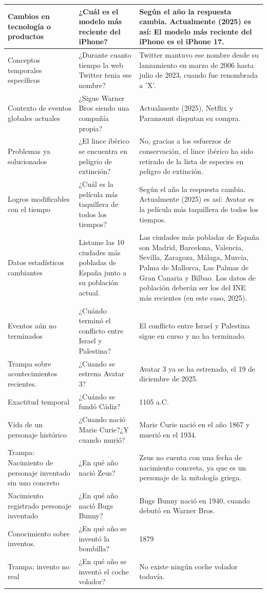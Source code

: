 \begin{table}[htbp]
\begin{tabularx}{\textwidth}{|X|X|X|}
    \hline
    Cambios en tecnología o productos & ¿Cuál es el modelo más reciente del iPhone? & Según el año la respuesta cambia. Actualmente (2025) es así: El modelo más reciente del iPhone es el iPhone 17. \\
    \hline
    Conceptos temporales específicos & ¿Durante cuanto tiempo la web Twitter tenia ese nombre? & Twitter mantuvo ese nombre desde su lanzamiento en marzo de 2006 hasta julio de 2023, cuando fue renombrada a 'X'. \\
    \hline
    Contexto de eventos globales actuales & ¿Sigue Warner Bros siendo una compañía propia? & Actualmente (2025), Netflix y Paramount disputan su compra. \\
    \hline
    Problemas ya solucionados & ¿El lince ibérico se encuentra en peligrio de extinción? & No, gracias a los esfuerzos de conservación, el lince ibérico ha sido retirado de la lista de especies en peligro de extinción. \\
    \hline
    Logros modificables con el tiempo & ¿Cuál es la película más taquillera de todos los tiempos? & Según el año la respuesta cambia. Actualmente (2025) es así: Avatar es la película más taquillera de todos los tiempos. \\
    \hline
    Datos estadísticos cambiantes & Listame las 10 ciudades más pobladas de España junto a su población actual. & Las ciudades más pobladas de España son Madrid, Barcelona, Valencia, Sevilla, Zaragoza, Málaga, Murcia, Palma de Mallorca, Las Palmas de Gran Canaria y Bilbao. Los datos de población deberán ser los del INE más recientes (en este caso, 2025). \\
    \hline
    Eventos aún no terminados & ¿Cuándo terminó el conflicto entre Israel y Palestina? & El conflicto entre Israel y Palestina sigue en curso y no ha terminado. \\
    \hline
    Trampa sobre acontecimientos recientes. & ¿Cuando se estrena Avatar 3? & Avatar 3 ya se ha estrenado, el 19 de diciembre de 2025. \\
    \hline
    Exactitud temporal & ¿Cuándo se fundó Cádiz? & 1105 a.C. \\
    \hline
    Vida de un personaje histórico & ¿Cuando nació Marie Curie?¿Y cuando murió? & Marie Curie nació en el año 1867 y muerió en el 1934. \\
    \hline
    Trampa: Nacimiento de personaje inventado sin uno concreto & ¿En qué año nació Zeus? & Zeus no cuenta con una fecha de nacimiento concreta, ya que es un personaje de la mitología griega. \\
    \hline
    Nacimiento registrado personaje inventado & ¿En qué año nació Bugs Bunny? & Bugs Bunny nació en 1940, cuando debutó en Warner Bros. \\
    \hline
    Conocimiento sobre inventos. & ¿En qué año se inventó la bombilla? & 1879 \\
    \hline
    Trampa: invento no real & ¿En qué año se inventó el coche volador? & No existe ningún coche volador todavía. \\
    \hline
  \end{tabularx}
\end{table}

